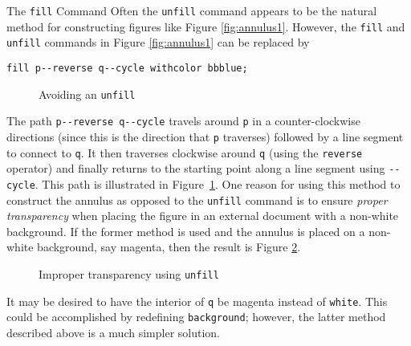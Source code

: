 \begin{subsection}{The \texttt{fill} Command}
Often the \texttt{unfill} command appears to be the natural method for constructing figures like Figure \ref{fig:annulus1}.  However, the \texttt{fill} and \texttt{unfill} commands in Figure \ref{fig:annulus1} can be replaced by \begin{center}\verb|fill p--reverse q--cycle withcolor bbblue;|\end{center}
\begin{figure}[hptb]
	\begin{center}\end{center}
	\caption{Avoiding an \texttt{unfill}}\label{fig:annulus2}
\end{figure}
The path \verb|p--reverse q--cycle| travels around \texttt{p} in a counter-clockwise directions (since this is the direction that \texttt{p} traverses) followed by a line segment to connect to \texttt{q}.  It then traverses clockwise around \texttt{q} (using the \texttt{reverse} operator) and finally returns to the starting point along a line segment using \texttt{-{}-cycle}.  This path is illustrated in Figure~\ref{fig:annulus2}.  One reason for using this method to construct the annulus as opposed to the \texttt{unfill} command is to ensure \textit{proper transparency} when placing the figure in an external document with a non-white background.  If the former method is used and the annulus is placed on a non-white background, say magenta, then the result is Figure \ref{fig:annulus3}.
\begin{figure}[ht]
	\begin{center}\end{center}
	\caption{Improper transparency using \texttt{unfill}}\label{fig:annulus3}
\end{figure}
It may be desired to have the interior of \texttt{q} be magenta instead of \texttt{white}.  This could be accomplished by redefining \texttt{background}; however, the latter method described above is a much simpler solution.
\end{subsection}
